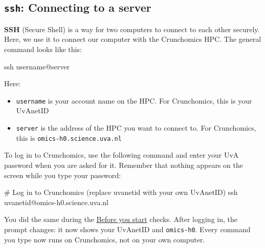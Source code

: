 \documentclass[
  letterpaper,
  DIV=11,
  numbers=noendperiod]{scrreprt}
\newenvironment{Shaded}{}{}
\newcommand{\CommentTok}[1]{\textcolor[rgb]{0.42,0.45,0.49}{#1}}
\newcommand{\FunctionTok}[1]{\textcolor[rgb]{0.44,0.26,0.76}{#1}}
\newcommand{\NormalTok}[1]{\textcolor[rgb]{0.14,0.16,0.18}{#1}}
\providecommand{\tightlist}{%
  \setlength{\itemsep}{0pt}\setlength{\parskip}{0pt}}
\begin{document}
\subsection{\texorpdfstring{\texttt{ssh}: Connecting to a
server}{ssh: Connecting to a server}}\label{ssh-connecting-to-a-server}

\textbf{SSH} (Secure Shell) is a way for two computers to connect to
each other securely. Here, we use it to connect our computer with the
Crunchomics HPC. The general command looks like this:

\begin{Shaded}
\begin{Highlighting}[]
\FunctionTok{ssh}\NormalTok{ username@server}
\end{Highlighting}
\end{Shaded}

Here:

\begin{itemize}
\tightlist
\item
  \texttt{username} is your account name on the HPC. For Crunchomics,
  this is your UvAnetID
\item
  \texttt{server} is the address of the HPC you want to connect to. For
  Crunchomics, this is \texttt{omics-h0.science.uva.nl}
\end{itemize}

To log in to Crunchomics, use the following command and enter your UvA
password when you are asked for it. Remember that nothing appears on the
screen while you type your password:

\begin{Shaded}
\begin{Highlighting}[]
\CommentTok{\# Log in to Crunchomics (replace uvanetid with your own UvAnetID)}
\FunctionTok{ssh}\NormalTok{ uvanetid@omics{-}h0.science.uva.nl}
\end{Highlighting}
\end{Shaded}

You did the same during the \href{installation.qmd}{Before you start}
checks. After logging in, the prompt changes: it now shows your UvAnetID
and \texttt{omics-h0}. Every command you type now runs on Crunchomics,
not on your own computer.
\end{document}
